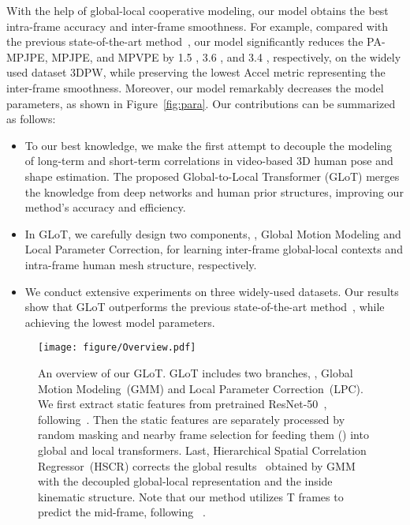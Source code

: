 \documentclass[10pt,twocolumn,letterpaper]{article}
\begin{document}
	With the help of global-local cooperative modeling, our model obtains the best intra-frame accuracy and inter-frame smoothness. For example, compared with the previous state-of-the-art method~\cite{MPS-net}, our model significantly reduces the PA-MPJPE, MPJPE, and MPVPE by 1.5 , 3.6 , and 3.4 , respectively, on the widely used dataset 3DPW\cite{3DPW}, while preserving the lowest Accel metric representing the inter-frame smoothness. Moreover, our model remarkably decreases the model parameters, as shown in Figure~\ref{fig:para}.
	Our contributions can be summarized as follows:
\begin{itemize}
		\item 
To our best knowledge, we make the first attempt to decouple the modeling of long-term and short-term correlations in video-based 3D human pose and shape estimation. The proposed Global-to-Local Transformer (GLoT) merges the knowledge from deep networks and human prior structures, improving our method's accuracy and efficiency.
		\item 
		In GLoT, we carefully design two components, \ie, Global Motion Modeling and Local Parameter Correction, for learning inter-frame global-local contexts and intra-frame human mesh structure, respectively.
		\item 
		We conduct extensive experiments on three widely-used datasets. Our results show that GLoT outperforms the previous state-of-the-art method~\cite{MPS-net}, while achieving the lowest model parameters.
		
	\end{itemize}
	\begin{figure*}[!t]
		\centering
		\texttt{[image: figure/Overview.pdf]}
		\vspace{-1.5 em}
		\caption{An overview of our GLoT. 
			GLoT includes two branches, \ie,  Global Motion Modeling~(GMM) and Local Parameter Correction~(LPC). We first extract static features from pretrained ResNet-50~\cite{ResNet}, following~\cite{VIBE, TCMR, MPS-net}. Then the static features  are separately processed by random masking and nearby frame selection for feeding them () into global and local transformers. Last, Hierarchical Spatial Correlation Regressor~(HSCR) corrects the global results~ obtained by GMM with the decoupled global-local representation  and the inside kinematic structure. Note that our method utilizes T frames to predict the mid-frame, following ~\cite{TCMR, MPS-net}.
		}
\label{fig:Overview}
		\vspace{-1.2 em}
	\end{figure*}
	
\end{document}
